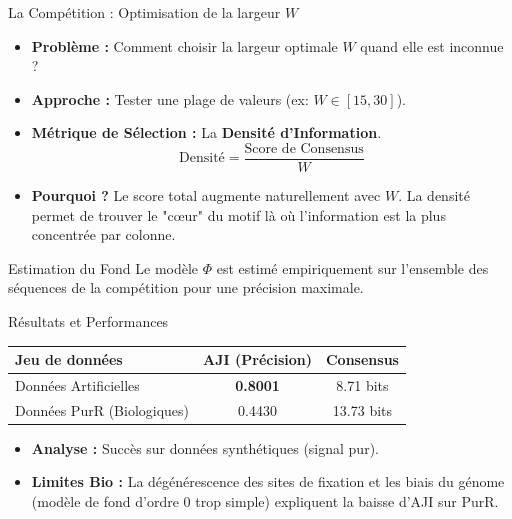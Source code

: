 \documentclass[10pt]{beamer}
\begin{document}
\begin{frame}{La Compétition : Optimisation de la largeur $W$}
    \begin{itemize}
        \item \textbf{Problème :} Comment choisir la largeur optimale $W$ quand elle est inconnue ?
        \item \textbf{Approche :} Tester une plage de valeurs (ex: $W \in [15, 30]$).
        \item \textbf{Métrique de Sélection :} La \textbf{Densité d'Information}.
        \begin{equation}
            \text{Densité} = \frac{\text{Score de Consensus}}{W}
        \end{equation}
        \item \textbf{Pourquoi ?} Le score total augmente naturellement avec $W$. La densité permet de trouver le "cœur" du motif là où l'information est la plus concentrée par colonne.
    \end{itemize}
    \begin{block}{Estimation du Fond}
        Le modèle $\Phi$ est estimé empiriquement sur l'ensemble des séquences de la compétition pour une précision maximale.
    \end{block}
\end{frame}


\begin{frame}{Résultats et Performances}
    \begin{table}
        \centering
        \begin{tabular}{|l|c|c|}
            \hline
            \textbf{Jeu de données} & \textbf{AJI (Précision)} & \textbf{Consensus} \\
            \hline
            Données Artificielles & \textbf{0.8001} & 8.71 bits \\
            Données PurR (Biologiques) & 0.4430 & 13.73 bits \\
            \hline
        \end{tabular}
    \end{table}
    \begin{itemize}
        \item \textbf{Analyse :} Succès sur données synthétiques (signal pur).
        \item \textbf{Limites Bio :} La dégénérescence des sites de fixation et les biais du génome (modèle de fond d'ordre 0 trop simple) expliquent la baisse d'AJI sur PurR.
    \end{itemize}
\end{frame}
\end{document}
